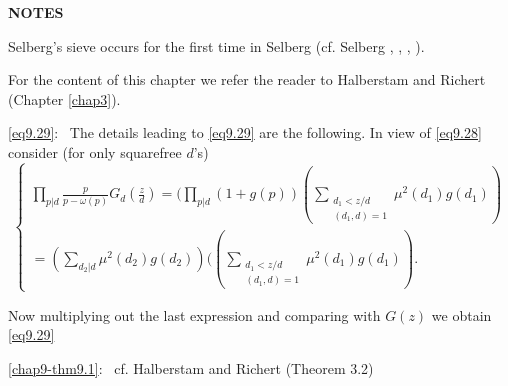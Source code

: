 \begin{center}
\textbf{NOTES}
\end{center}

Selberg's sieve occurs for the first time in Selberg \cite{key1} (cf. Selberg
\cite{key3}, \cite{key4}, \cite{key5}, \cite{key6}). 

For the content of this chapter we refer the reader to Halberstam and
Richert\pageoriginale \cite{key1} (Chapter \ref{chap3}). 

\eqref{eq9.29}:~ The details leading to \eqref{eq9.29} are the
following. In view of \eqref{eq9.28} consider (for only squarefree $d$'s) 
\begin{equation*}
\begin{cases}
\prod_{p|d} \frac{p}{p-\omega(p)}G_d(\frac{z}{d}) = ( \prod_{p|d}(1+
g(p))( \sum \limits_{\substack{d_1<z/d \\ (d_1,d) =1}}
\mu^2(d_1)g(d_1))\\
 = 
(\sum\limits_{d_2|d}\mu^2(d_2)g(d_2))(( \sum
\limits_{\substack{d_1<z/d \\ (d_1,d) =1}}\mu^2(d_1)g(d_1)).
\end{cases}\tag{9.50}\label{eq9.50}
\end{equation*}

Now multiplying out the last expression and comparing with $G(z)$ we
obtain \eqref{eq9.29} 

\ref{chap9-thm9.1}:~ cf. Halberstam and Richert \cite{key1} (Theorem
3.2) 

